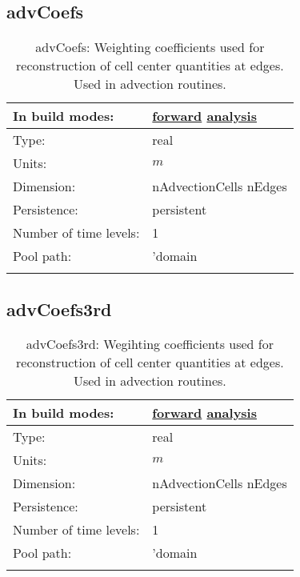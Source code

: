 \subsection[advCoefs]{advCoefs}
\label{subsec:var_sec_mesh_advCoefs}
\begin{center}
\begin{longtable}{| p{2.0in} | p{4.0in} |}
        \hline 
        In build modes: & \hyperref[subsec:forward_var_tab_mesh]{forward} \hyperref[subsec:analysis_var_tab_mesh]{analysis} \\
        \hline 
        Type: & real \\
        \hline 
        Units: & $m$ \\
        \hline 
        Dimension: & nAdvectionCells nEdges \\
        \hline 
        Persistence: & persistent \\
        \hline 
        Number of time levels: & 1 \\
        \hline 
            Pool path: & 'domain %
 \\
		 \hline 
    \caption{advCoefs: Weighting coefficients used for reconstruction of cell center quantities at edges. Used in advection routines.}
\end{longtable}
\end{center}
\subsection[advCoefs3rd]{advCoefs3rd}
\label{subsec:var_sec_mesh_advCoefs3rd}
\begin{center}
\begin{longtable}{| p{2.0in} | p{4.0in} |}
        \hline 
        In build modes: & \hyperref[subsec:forward_var_tab_mesh]{forward} \hyperref[subsec:analysis_var_tab_mesh]{analysis} \\
        \hline 
        Type: & real \\
        \hline 
        Units: & $m$ \\
        \hline 
        Dimension: & nAdvectionCells nEdges \\
        \hline 
        Persistence: & persistent \\
        \hline 
        Number of time levels: & 1 \\
        \hline 
            Pool path: & 'domain %
 \\
		 \hline 
    \caption{advCoefs3rd: Wegihting coefficients used for reconstruction of cell center quantities at edges. Used in advection routines.}
\end{longtable}
\end{center}
